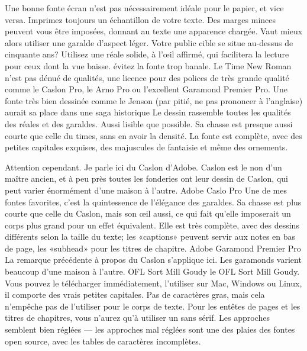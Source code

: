 \documentclass[12pt,a4paper,twocolumn]{book} %
\begin{document}
Une bonne fonte écran n’est pas nécessairement idéale pour le papier, et vice versa. Imprimez toujours un échantillon de votre texte.
Des marges minces peuvent vous être imposées, donnant au texte une apparence chargée. Vaut mieux alors utiliser une garalde d’aspect léger. Votre public cible se situe au-dessus de cinquante ans? Utilisez une réale solide, à l’œil affirmé, qui facilitera la lecture pour ceux dont la vue baisse.
évitez la fonte trop banale. Le Time New Roman n’est pas dénué de qualités,
une licence pour des polices de très grande qualité comme le Caslon Pro,  le Arno Pro ou l’excellent Garamond Premier Pro.
Une fonte très bien dessinée comme le Jenson (par pitié, ne pas prononcer à l’anglaise) aurait sa place dans une saga historique
Le dessin rassemble toutes les qualités des réales et des garaldes. Aussi lisible que possible. Sa chasse est presque aussi courte que celle du times, sans en avoir la densité. La fonte est complète, avec des petites capitales exquises, des majuscules de fantaisie et même des ornements.

Attention cependant. Je parle ici du Caslon d’Adobe. Caslon est le non d’un maître ancien, et à peu près toutes les fonderies ont leur dessin de Caslon, qui peut varier énormément d’une maison à l’autre. 
Adobe Caslo Pro
Une de mes fontes favorites, c’est la quintessence de l’élégance des garaldes. Sa chasse est plus courte que celle du Caslon, mais son œil aussi, ce qui fait qu’elle imposerait un corps plus grand pour un effet équivalent. Elle est très complète, avec des dessins différents selon la taille du texte; les «captions» peuvent servir aux notes en bas de page, les «subhead» pour les titres de chapitre.
Adobe Garamond Premier Pro
La remarque précédente à propos du Caslon s’applique ici. Les garamonds varient beaucoup d’une maison à l’autre.
OFL Sort Mill Goudy
le OFL Sort Mill Goudy. Vous pouvez le télécharger immédiatement, l’utiliser sur Mac, Windows ou Linux, il comporte des vrais petites capitales. Pas de caractères gras, mais cela n’empêche pas de l’utiliser pour le corps de texte. Pour les entêtes de pages et les titres de chapitres, vous n’aurez qu’à utiliser un sans sérif. Les approches semblent bien réglées — les approches mal réglées sont une des plaies des fontes open source, avec les tables de caractères incomplètes.
\end{document}
